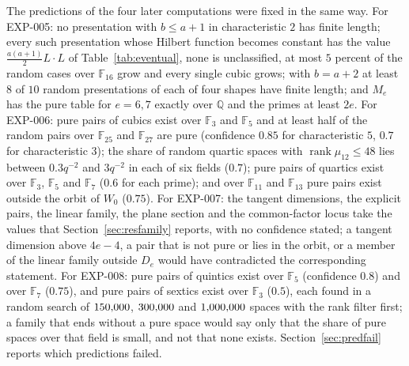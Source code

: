 \documentclass[11pt]{article}
\theoremstyle{definition}
\theoremstyle{remark}
\newcommand{\EXP}[1]{\mbox{EXP-#1}}
\newcommand{\Q}{\mathbb{Q}}
\newcommand{\F}{\mathbb{F}}
\begin{document}
The predictions of the four later computations were fixed in the same way. For \EXP{005}: no presentation with $b\le a+1$ in characteristic $2$ has finite length; every such presentation whose Hilbert function becomes constant has the value $\tfrac{a(a+1)}2L\cdot L$ of Table~\ref{tab:eventual}, none is unclassified, at most $5$ percent of the random cases over $\F_{16}$ grow and every single cubic grows; with $b=a+2$ at least $8$ of $10$ random presentations of each of four shapes have finite length; and $M_e$ has the pure table for $e=6,7$ exactly over $\Q$ and the primes at least $2e$. For \EXP{006}: pure pairs of cubics exist over $\F_3$ and $\F_5$ and at least half of the random pairs over $\F_{25}$ and $\F_{27}$ are pure (confidence $0.85$ for characteristic $5$, $0.7$ for characteristic $3$); the share of random quartic spaces with $\operatorname{rank}\mu_{12}\le48$ lies between $0.3q^{-2}$ and $3q^{-2}$ in each of six fields ($0.7$); pure pairs of quartics exist over $\F_3$, $\F_5$ and $\F_7$ ($0.6$ for each prime); and over $\F_{11}$ and $\F_{13}$ pure pairs exist outside the orbit of $W_0$ ($0.75$). For \EXP{007}: the tangent dimensions, the explicit pairs, the linear family, the plane section and the common-factor locus take the values that Section~\ref{sec:resfamily} reports, with no confidence stated; a tangent dimension above $4e-4$, a pair that is not pure or lies in the orbit, or a member of the linear family outside $D_e$ would have contradicted the corresponding statement. For \EXP{008}: pure pairs of quintics exist over $\F_5$ (confidence $0.8$) and over $\F_7$ ($0.75$), and pure pairs of sextics exist over $\F_3$ ($0.5$), each found in a random search of $150{,}000$, $300{,}000$ and $1{,}000{,}000$ spaces with the rank filter first; a family that ends without a pure space would say only that the share of pure spaces over that field is small, and not that none exists. Section~\ref{sec:predfail} reports which predictions failed.
\end{document}
